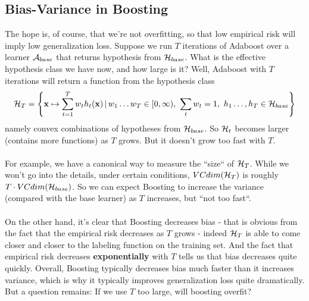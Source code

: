 \subsection{Bias-Variance in Boosting}
The hope is, of course, that we're not overfitting, so that low empirical risk will imply low generalization loss. Suppose we run $T$ iterations of Adaboost over a learner $\mathcal{A}_{base}$ that returns hypothesis from $\mathcal{H}_{base}$. What is the effective hypothesis class we have now, and how large is it? Well, Adaboost with $T$ iterations will return a function from the hypothesis class  
$$\mathcal{H}_T = \left\{ \mathbf{x}\mapsto \sum_{t=1}^Tw_t h_t(\mathbf{x}) \,| \, w_1\ldots w_T\in[0,\infty),\,\, \sum_t w_t=1,\,\, h_1\ldots,h_T\in\mathcal{H}_{base}\right\}$$
namely convex combinations of hypotheses from $\mathcal{H}_{base}$. So $\mathcal{H}_t$ becomes larger (contains more functions) as $T$ grows. But it doesn't grow too fast with $T$. 
\\~\\
For example, we have a canonical way to measure the ``size`` of $\mathcal{H}_T$. While we won't go into the details, under certain conditions, $VCdim(\mathcal{H}_T)$ is roughly $T\cdot VCdim(\mathcal{H}_{base})$. So we can expect Boosting to increase the variance (compared with the base learner) as $T$ increases, but ``not too fast``. 
\\~\\
On the other hand, it's clear that Boosting decreases bias - that is obvious from the fact that the empirical risk decreases as $T$ grows - indeed $\mathcal{H}_T$ is able to come closer and closer to the labeling function on the training set. And the fact that empirical risk decreases \textbf{exponentially} with $T$ tells us that bias decreases quite quickly. Overall, Boosting typically decreases bias much faster than it increases variance, which is why it typically improves generalization loss quite dramatically. But a question remains: If we use $T$ too large, will boosting overfit? 
